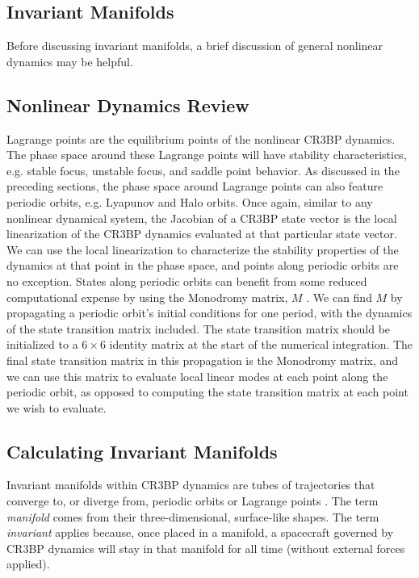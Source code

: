 \documentclass[conf]{new-aiaa}
\begin{document}
\begin{multicols}{2}
\section{Invariant Manifolds}

Before discussing invariant manifolds, a brief discussion of 
general nonlinear dynamics may be helpful. 

\subsection{Nonlinear Dynamics Review}
Lagrange points 
are the equilibrium points of the nonlinear CR3BP dynamics.
The phase space around these Lagrange points will have stability 
characteristics, e.g. stable focus, unstable focus, and
saddle point behavior. As discussed in the preceding sections, the phase
space around Lagrange points can also feature periodic orbits, e.g. 
Lyapunov and Halo orbits. Once again, similar to any nonlinear 
dynamical system, the Jacobian of a CR3BP state vector is the 
local linearization of the CR3BP dynamics evaluated at that particular 
state vector. We can use the local linearization to characterize the 
stability properties of the dynamics at that point in the phase space, 
and points along periodic orbits are no exception. States 
along periodic orbits can benefit from some reduced computational 
expense by using the Monodromy matrix, $M$ \cite{rund2018interplanetary}. 
We can find $M$ by 
propagating a periodic orbit's initial conditions for one period, 
with the dynamics of the state transition matrix included. The 
state transition matrix should be initialized to a $6 \times 6$ 
identity matrix at the start of the numerical integration. 
The final state transition matrix in this propagation is the 
Monodromy matrix, and we can use this matrix to 
evaluate local linear modes at each point along the periodic 
orbit, as opposed to computing the state transition matrix at each point 
we wish to evaluate. 

\subsection{Calculating Invariant Manifolds}
Invariant manifolds within CR3BP dynamics are tubes of trajectories
that converge to, or diverge from, periodic orbits or Lagrange points
\cite{rund2018interplanetary} \cite{topputo2005low}. The term 
\textit{manifold} comes from their three-dimensional, surface-like
shapes. The term \textit{invariant} applies because, once placed in 
a manifold, a spacecraft governed by CR3BP dynamics
will stay in that manifold for all time (without external forces applied).


\end{multicols}
\end{document}
